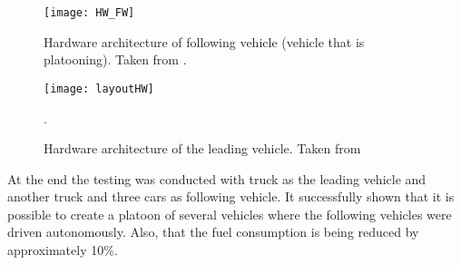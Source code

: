 % 
\begin{figure}[t]
    \centering
    \texttt{[image: HW\_FW]}
    \caption{Hardware architecture of following vehicle (vehicle that is platooning). Taken from \cite{Chan2012ProjectSARTRE}.}
    \label{fig:HW_FW}
\end{figure}
% 
\begin{figure}[t]
    \centering
    \texttt{[image: layoutHW]}
    \caption{Hardware architecture of the leading vehicle. Taken from \cite{Chan2012ProjectSARTRE}}.
    \label{fig:HW_LW}
\end{figure}
% 
At the end the testing was conducted with truck as the leading vehicle and another truck and three cars as following vehicle. It successfully shown that it is possible to create a platoon of several vehicles where the following vehicles were driven autonomously. Also, that the fuel consumption is being reduced by approximately 10\%.